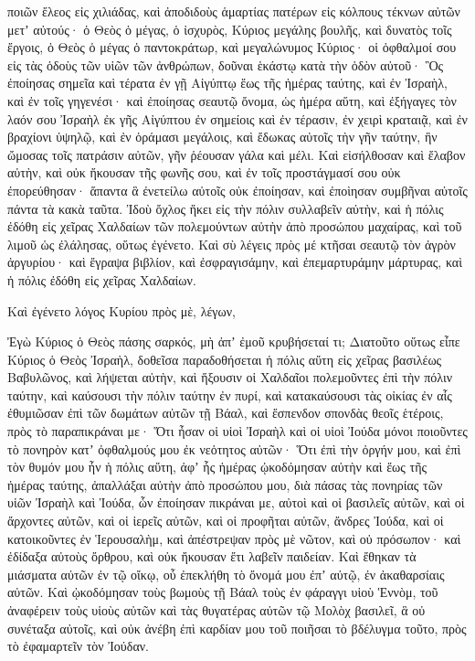 {ποιῶν ἔλεος εἰς χιλιάδας, καὶ ἀποδιδοὺς ἁμαρτίας πατέρων εἰς κόλπους τέκνων αὐτῶν μετʼ αὐτούς· ὁ Θεὸς ὁ μέγας, ὁ ἰσχυρὸς,
Κύριος μεγάλης βουλῆς, καὶ δυνατὸς τοῖς ἔργοις, ὁ Θεὸς ὁ μέγας ὁ παντοκράτωρ, καὶ μεγαλώνυμος Κύριος· οἱ ὀφθαλμοί σου εἰς τὰς ὁδοὺς τῶν υἱῶν τῶν ἀνθρώπων, δοῦναι ἑκάστῳ κατὰ τὴν ὁδὸν αὐτοῦ·
Ὃς ἐποίησας σημεῖα καὶ τέρατα ἐν γῇ Αἰγύπτῳ ἕως τῆς ἡμέρας ταύτης, καὶ ἐν Ἰσραὴλ, καὶ ἐν τοῖς γηγενέσι· καὶ ἐποίησας σεαυτῷ ὄνομα, ὡς ἡμέρα αὕτη,
καὶ ἐξήγαγες τὸν λαόν σου Ἰσραὴλ ἐκ γῆς Αἰγύπτου ἐν σημείοις καὶ ἐν τέρασιν, ἐν χειρὶ κραταιᾷ,
καὶ ἐν βραχίονι ὑψηλῷ, καὶ ἐν ὁράμασι μεγάλοις, καὶ ἔδωκας αὐτοῖς τὴν γῆν ταύτην, ἣν ὤμοσας τοῖς πατράσιν αὐτῶν, γῆν ῥέουσαν γάλα καὶ μέλι.
Καὶ εἰσήλθοσαν καὶ ἔλαβον αὐτὴν, καὶ οὐκ ἤκουσαν τῆς φωνῆς σου, καὶ ἐν τοῖς προστάγμασί σου οὐκ ἐπορεύθησαν· ἅπαντα ἃ ἐνετείλω αὐτοῖς οὐκ ἐποίησαν, καὶ ἐποὶησαν συμβῆναι αὐτοῖς πάντα τὰ κακὰ ταῦτα.
Ἰδοὺ ὄχλος ἥκει εἰς τὴν πόλιν συλλαβεῖν αὐτὴν, καὶ ἡ πόλις ἐδόθη εἰς χεῖρας Χαλδαίων τῶν πολεμούντων αὐτὴν ἀπὸ προσώπου μαχαίρας, καὶ τοῦ λιμοῦ ὡς ἐλάλησας, οὕτως ἐγένετο.
Καὶ σὺ λέγεις πρὸς μέ κτῆσαι σεαυτῷ τὸν ἀγρὸν ἀργυρίου· καὶ ἔγραψα βιβλίον, καὶ ἐσφραγισάμην, καὶ ἐπεμαρτυράμην μάρτυρας, καὶ ἡ πόλις ἐδόθη εἰς χεῖρας Χαλδαίων.
\par }{\PP {}Καὶ ἐγένετο λόγος Κυρίου πρὸς μὲ, λέγων,
\par }{\PP {}Ἐγὼ Κύριος ὁ Θεὸς πάσης σαρκός, μὴ ἀπʼ ἐμοῦ κρυβήσεταί τι;
Διατοῦτο οὕτως εἶπε Κύριος ὁ Θεὸς Ἰσραὴλ, δοθεῖσα παραδοθήσεται ἡ πόλις αὕτη εἰς χεῖρας βασιλέως Βαβυλῶνος, καὶ λήψεται αὐτὴν,
καὶ ἥξουσιν οἱ Χαλδαῖοι πολεμοῦντες ἐπὶ τὴν πόλιν ταύτην, καὶ καύσουσι τὴν πόλιν ταύτην ἐν πυρί, καὶ κατακαύσουσι τὰς οἰκίας ἐν αἷς ἐθυμιῶσαν ἐπὶ τῶν δωμάτων αὐτῶν τῇ Βάαλ, καὶ ἔσπενδον σπονδὰς θεοῖς ἑτέροις, πρὸς τὸ παραπικράναι με·
Ὅτι ἦσαν οἱ υἱοὶ Ἰσραὴλ καὶ οἱ υἱοὶ Ἰούδα μόνοι ποιοῦντες τὸ πονηρὸν κατʼ ὀφθαλμούς μου ἐκ νεὁτητος αὐτῶν·
Ὅτι ἐπὶ τὴν ὀργήν μου, καὶ ἐπὶ τὸν θυμόν μου ἦν ἡ πόλις αὕτη, ἀφʼ ἧς ἡμέρας ᾠκοδόμησαν αὐτὴν καὶ ἕως τῆς ἡμέρας ταύτης, ἀπαλλάξαι αὐτὴν ἀπὸ προσώπου μου,
διὰ πάσας τὰς πονηρίας τῶν υἱῶν Ἰσραὴλ καὶ Ἰούδα, ὧν ἐποίησαν πικράναι με, αὐτοὶ καὶ οἱ βασιλεῖς αὐτῶν, καὶ οἱ ἄρχοντες αὐτῶν, καὶ οἱ ἱερεῖς αὐτῶν, καὶ οἱ προφῆται αὐτῶν, ἄνδρες Ἰούδα, καὶ οἱ κατοικοῦντες ἐν Ἱερουσαλὴμ,
καὶ ἀπέστρεψαν πρὸς μὲ νῶτον, καὶ οὐ πρόσωπον· καὶ ἐδίδαξα αὐτοὺς ὄρθρου, καὶ οὐκ ἤκουσαν ἔτι λαβεῖν παιδείαν.
Καὶ ἔθηκαν τὰ μιάσματα αὐτῶν ἐν τῷ οἴκῳ, οὗ ἐπεκλήθη τὸ ὄνομά μου ἐπʼ αὐτῷ, ἐν ἀκαθαρσίαις αὐτῶν.
Καὶ ᾠκοδόμησαν τοὺς βωμοὺς τῇ Βάαλ τοὺς ἐν φάραγγι υἱοὺ Ἑννὸμ, τοῦ ἀναφέρειν τοὺς υἱοὺς αὐτῶν καὶ τὰς θυγατέρας αὐτῶν τῷ Μολὸχ βασιλεῖ, ἃ οὐ συνέταξα αὐτοῖς, καὶ οὐκ ἀνέβη ἐπὶ καρδίαν μου τοῦ ποιῆσαι τὸ βδέλυγμα τοῦτο, πρὸς τὸ ἐφαμαρτεῖν τὸν Ἰούδαν.
}
